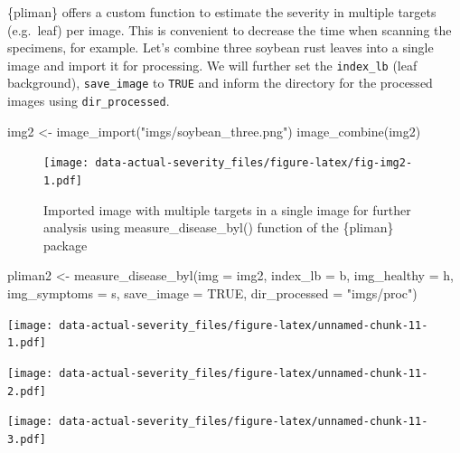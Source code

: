 \documentclass[
  letterpaper,
]{book}
\newenvironment{Shaded}{\begin{snugshade}}{\end{snugshade}}
\newcommand{\AttributeTok}[1]{\textcolor[rgb]{0.40,0.45,0.13}{#1}}
\newcommand{\ConstantTok}[1]{\textcolor[rgb]{0.56,0.35,0.01}{#1}}
\newcommand{\FunctionTok}[1]{\textcolor[rgb]{0.28,0.35,0.67}{#1}}
\newcommand{\NormalTok}[1]{\textcolor[rgb]{0.00,0.23,0.31}{#1}}
\newcommand{\OtherTok}[1]{\textcolor[rgb]{0.00,0.23,0.31}{#1}}
\newcommand{\StringTok}[1]{\textcolor[rgb]{0.13,0.47,0.30}{#1}}
\begin{document}
\{pliman\} offers a custom function to estimate the severity in multiple
targets (e.g.~leaf) per image. This is convenient to decrease the time
when scanning the specimens, for example. Let's combine three soybean
rust leaves into a single image and import it for processing. We will
further set the \texttt{index\_lb} (leaf background),
\texttt{save\_image} to \texttt{TRUE} and inform the directory for the
processed images using \texttt{dir\_processed}.

\begin{Shaded}
\begin{Highlighting}[]
\NormalTok{img2 }\OtherTok{\textless{}{-}} \FunctionTok{image\_import}\NormalTok{(}\StringTok{"imgs/soybean\_three.png"}\NormalTok{)}
\FunctionTok{image\_combine}\NormalTok{(img2)}
\end{Highlighting}
\end{Shaded}

\begin{figure}

\texttt{[image: data-actual-severity\_files/figure-latex/fig-img2-1.pdf]} \hfill{}

\caption{\label{fig-img2}Imported image with multiple targets in a
single image for further analysis using measure\_disease\_byl() function
of the \{pliman\} package}

\end{figure}

\begin{Shaded}
\begin{Highlighting}[]
\NormalTok{ pliman2 }\OtherTok{\textless{}{-}} \FunctionTok{measure\_disease\_byl}\NormalTok{(}\AttributeTok{img =}\NormalTok{ img2,}
                        \AttributeTok{index\_lb =}\NormalTok{ b,}
                        \AttributeTok{img\_healthy =}\NormalTok{ h,}
                        \AttributeTok{img\_symptoms =}\NormalTok{ s, }
                        \AttributeTok{save\_image =} \ConstantTok{TRUE}\NormalTok{,}
                        \AttributeTok{dir\_processed =} \StringTok{"imgs/proc"}\NormalTok{)}
\end{Highlighting}
\end{Shaded}

\texttt{[image: data-actual-severity\_files/figure-latex/unnamed-chunk-11-1.pdf]}

\texttt{[image: data-actual-severity\_files/figure-latex/unnamed-chunk-11-2.pdf]}

\texttt{[image: data-actual-severity\_files/figure-latex/unnamed-chunk-11-3.pdf]}
\end{document}
